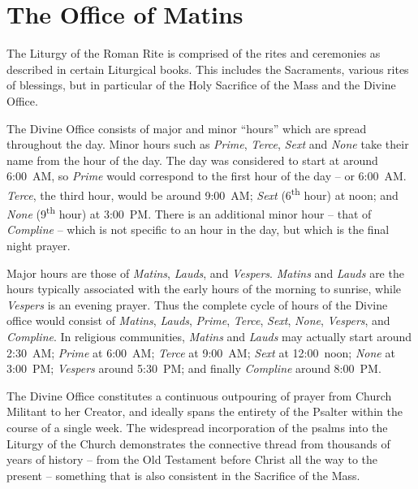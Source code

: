 \documentclass[letterpaper,12pt]{book} %
\begin{document}
\normalsize
{}


\chapter{The Office of Matins}

{
	\def\matins{\emph{Matins}}
	\def\lauds{\emph{Lauds}}
	\def\vespers{\emph{Vespers}}
	\def\compline{\emph{Compline}}
	\def\prime{\emph{Prime}}
	\def\terce{\emph{Terce}}
	\def\sext{\emph{Sext}}
	\def\none{\emph{None}}
	\def\th{\textsuperscript{th}}
	\def\rd{\textsuperscript{rd}}
	\setlength{\parindent}{0cm}
	\setlength{\parskip}{\baselineskip}
	The Liturgy of the Roman Rite is comprised of the rites and ceremonies as described in certain Liturgical books. This
	includes the Sacraments, various rites of blessings, but in particular of the Holy Sacrifice of the Mass and the Divine Office.

	The Divine Office consists of major and minor ``hours'' which are spread throughout the day. Minor hours such as \prime,
	\terce{}, \sext{} and \none{} take their name from the hour of the day. The day was considered to start at around 6:00~AM, so
	\prime{} would correspond to the first hour of the day – or 6:00~AM. \terce{}, the third hour, would be around 9:00~AM; \sext{}
	(6\th{} hour) at noon; and \none{} (9\th{} hour) at 3:00~PM. There is an additional minor hour – that of \compline{} – which is not
	specific to an hour in the day, but which is the final night prayer.

	Major hours are those of \matins{}, \lauds{}, and \vespers{}. \matins{} and \lauds{} are the hours typically associated with the early
	hours of the morning to sunrise, while \vespers{} is an evening prayer. Thus the complete cycle of hours of the Divine office would
	consist of \matins{}, \lauds{}, \prime{}, \terce{}, \sext{}, \none{}, \vespers{}, and \compline{}. In religious communities, \matins{} and \lauds{}
	may actually start around 2:30~AM; \prime{} at 6:00~AM; \terce{} at 9:00~AM; \sext{} at 12:00~noon; \none{} at 3:00~PM; \vespers{}
	around 5:30~PM; and finally \compline{} around 8:00~PM.

	The Divine Office constitutes a continuous outpouring of prayer from Church Militant to her Creator, and ideally spans the
	entirety of the Psalter within the course of a single week. The widespread incorporation of the psalms into the Liturgy of
	the Church demonstrates the connective thread from thousands of years of history – from the Old Testament before Christ
	all the way to the present – something that is also consistent in the Sacrifice of the Mass.

}
\end{document}
